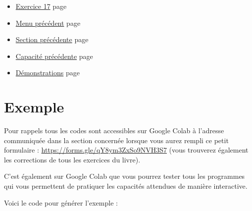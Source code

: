 \documentclass[a4paper,11pt]{book}
\begin{document}
\label{org7e69f0d}
\label{page:capacity5-menu}
\begin{itemize}
\item \hyperref[org4f79895]{Exercice 17} page \pageref{page:sec3.5.1exo17}
\item \hyperref[orgb90956a]{Menu précédent} page \pageref{page:capacities-menu}
\item \hyperref[org70c1962]{Section précédente} page \pageref{page:sec3.4.2exo16}
\item \hyperref[org376c46d]{Capacité précédente} page \pageref{page:sec3.4capacity3}
\item \hyperref[org08a4120]{Démonstrations} page \pageref{page:sec4proofs}
\end{itemize}





\clearpage

\section{Exemple}
\label{sec:org3698eeb}
\label{org9840e9a}
\label{page:sec3.5.0exemple}

Pour rappels tous les codes sont accessibles sur Google Colab à
l'adresse communiquée dans la section concernée lorsque vous
aurez rempli ce petit formulaire : \url{https://forms.gle/qY8ym3ZxSo9NVH3S7}
(vous trouverez également les corrections de tous les exercices du
livre).

C'est également sur Google Colab que vous pourrez tester tous les
programmes qui vous permettent de pratiquer les capacités attendues
de manière interactive.

\clearpage
Voici le code pour générer l'exemple :
\end{document}
